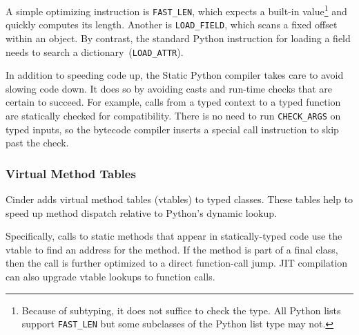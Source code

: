 \documentclass[english,cleveref,submission]{programming}
\newcommand{\SP}{Static Python}
\newcommand{\code}[1]{\texttt{#1}}
\begin{document}
A simple optimizing instruction is \code{FAST\_LEN}, which expects
a built-in value\footnote{Because of subtyping, it does not suffice to check
the type. All Python lists support \code{FAST\_LEN} but some subclasses
of the Python list type may not.}
and quickly computes its length.
Another is \code{LOAD\_FIELD}, which scans a fixed offset within an object.
By contrast, the standard Python instruction for loading a field needs to
search a dictionary~(\code{LOAD\_ATTR}).

In addition to speeding code up, the \SP{} compiler takes care
to avoid slowing code down.
It does so by avoiding casts and run-time checks that are certain to succeed.
For example, calls from a typed context to a typed function are statically
checked for compatibility.
There is no need to run \code{CHECK\_ARGS} on typed inputs, so the bytecode
compiler inserts a special call instruction to skip past the check.



\subsubsection{Virtual Method Tables}
\label{s:vtable}

Cinder adds virtual method tables (vtables) to typed classes.
These tables help to speed up method dispatch relative to Python's
dynamic lookup.

Specifically, calls to static methods that appear in statically-typed
code use the vtable to find an address for the method.
If the method is part of a final class, then the call is further optimized
to a direct function-call jump.
JIT compilation can also upgrade vtable lookups to function calls.

\end{document}

